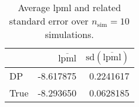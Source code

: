 \begin{table}[H]

\caption{Average lpml and related standard error over $n_{\text{sim}} = 10$ simulations.}
\centering
\begin{tabular}[t]{lrr}
\toprule
  & $\overbar{\text{lpml}}$ & $\text{sd}(\overbar{\text{lpml}})$\\
\midrule
DP & -8.617875 & 0.2241617\\
True & -8.293650 & 0.0628185\\
\bottomrule
\end{tabular}
\end{table}
